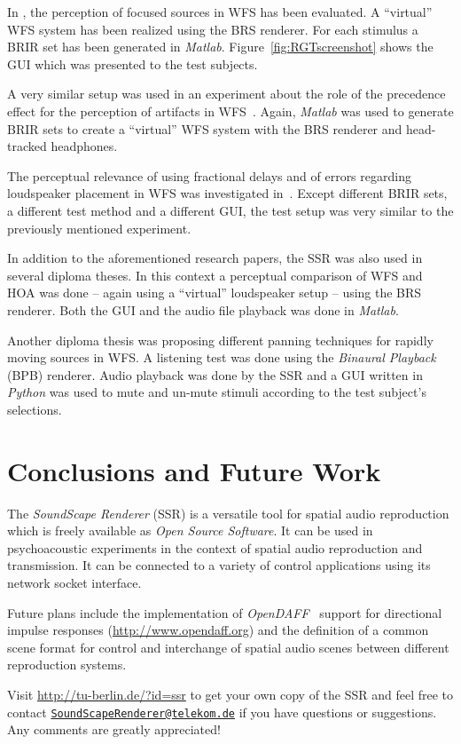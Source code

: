 \documentclass[a4paper]{article}
\begin{document}
In \cite{geier2010:perceptual}, the perception of focused sources in WFS
has been evaluated. A ``virtual'' WFS system has been realized using the BRS
renderer. For each stimulus a BRIR set has been generated in \emph{Matlab}.
Figure~\ref{fig:RGTscreenshot} shows the GUI which was presented to the test
subjects.

A very similar setup was used in an experiment about the role of the precedence
effect for the perception of artifacts in WFS~\cite{wierstorf_precedence_2010}.
Again, \emph{Matlab} was used to generate BRIR sets to create a ``virtual'' WFS
system with the BRS renderer and head-tracked headphones.

The perceptual relevance of using fractional delays and of errors regarding
loudspeaker placement in WFS was investigated
in~\cite{ahrens2010:perceptual}. Except different BRIR sets, a different test
method and a different GUI, the test setup was very similar to the previously
mentioned experiment.

In addition to the aforementioned research papers, the SSR was also used in
several diploma theses.
In this context a perceptual comparison of WFS and HOA was done -- again using a
``virtual'' loudspeaker setup -- using the BRS renderer. Both the GUI and the
audio file playback was done in \emph{Matlab}.

Another diploma thesis was proposing different panning techniques for rapidly
moving sources in WFS. A listening test was done using the \emph{Binaural
Playback} (BPB) renderer. Audio playback was done by the SSR and a GUI written
in \emph{Python} was used to mute and un-mute stimuli according to the test
subject's selections.

\section{Conclusions and Future Work}

The \emph{SoundScape Renderer} (SSR) is a versatile tool for spatial audio
reproduction which is freely available as \emph{Open Source Software}.
It can be used in psychoacoustic experiments in the context of spatial audio
reproduction and transmission.
It can be connected to a variety of control applications using its network
socket interface.

Future plans include the implementation of
\emph{OpenDAFF}~\cite{wefers2010:opendaff} support for directional impulse
responses (\url{http://www.opendaff.org}) and the definition of a common scene
format for control and interchange of spatial audio scenes between different
reproduction systems.

Visit \url{http://tu-berlin.de/?id=ssr}
to get your own copy of the SSR
and feel free to contact
\href{mailto:SoundScapeRenderer@telekom.de}
{\texttt{SoundScapeRenderer@telekom.de}}
if you have questions or suggestions.
Any comments are greatly appreciated!

\balance



\end{document}
